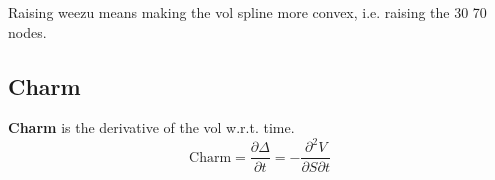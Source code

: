 \documentclass{article}
\begin{document}
    Raising weezu means making the vol spline more convex, i.e. raising the 30 70 nodes. 

  \subsection{Charm}

    \begin{definition}[Charm]
      \textbf{Charm} is the derivative of the vol w.r.t. time. 
      \begin{equation}
        \text{Charm} = \frac{\partial \Delta}{\partial t} = -\frac{\partial^2 V}{\partial S \partial t} 
      \end{equation}
    \end{definition}
\end{document}
